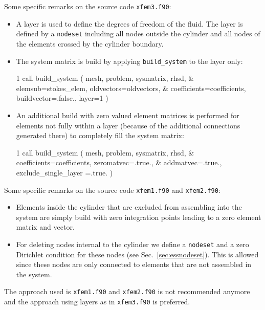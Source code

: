 Some specific remarks on the source code \texttt{xfem3.f90}:
\begin{itemize}
   \item A layer is used to define the degrees of freedom of the fluid.
The layer is defined by a
\texttt{nodeset} including all nodes outside the cylinder and all nodes
of the elements crossed by the cylinder boundary.
   \item The system matrix is build by applying \texttt{build\_system} to
the layer only:
\begin{listing}{1}
  call build_system ( mesh, problem, sysmatrix, rhsd, &
    elemsub=stokes_elem, oldvectors=oldvectors, &
    coefficients=coefficients, buildvector=.false., layer=1 )
\end{listing}
\item
An additional build 
with zero valued element matrices is performed for elements not
fully within a layer (because of the additional connections generated there) to
completely fill the system matrix:
\begin{listing}{1}
  call build_system ( mesh, problem, sysmatrix, rhsd, &
    coefficients=coefficients, zeromatvec=.true., &
    addmatvec=.true., exclude_single_layer =.true. )
\end{listing}

\end{itemize}

Some specific remarks on the source code \texttt{xfem1.f90} and \texttt{xfem2.f90}:
\begin{itemize}
   \item Elements inside the cylinder that are excluded from assembling into
the system are simply build with zero integration points leading to a zero
element matrix and vector.
   \item For deleting nodes internal to the cylinder we define a
\texttt{nodeset} and a zero Dirichlet condition for these nodes (see
Sec.~\ref{sec:essnodeset}). This is allowed since these nodes are only
connected to elements that are not assembled in the system.
\end{itemize}
The approach used is \texttt{xfem1.f90} and \texttt{xfem2.f90} is not
recommended anymore and the approach using layers as in \texttt{xfem3.f90} is
preferred.

